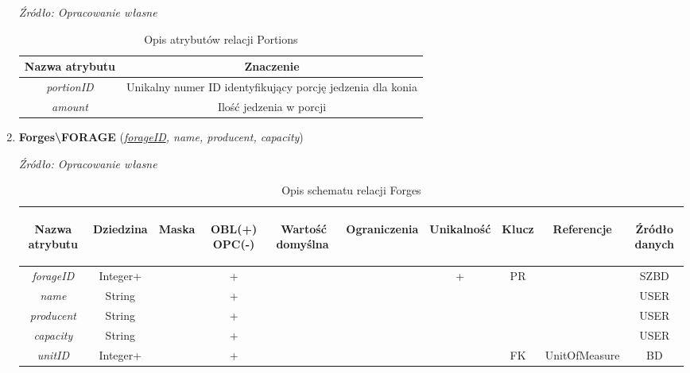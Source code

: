 \documentclass[12pt,oneside]{report}
\begin{document}
\begin{enumerate}[start=1,label={\bfseries REL\textbackslash0\arabic*}]
\begin{table}[H]
	\caption{Opis atrybutów relacji Portions}
	\textit{Źródło: Opracowanie własne}
	\label{PortionsAttributeDescription}
	\centering
	\begin{tabular}{|c|c|}
		\hline
		Nazwa atrybutu & Znaczenie \\
				\hline
		\textit{portionID}& Unikalny numer ID identyfikujący porcję jedzenia dla konia \\		
		\hline
		\textit{amount}& Ilość jedzenia w porcji\\
		\hline
	\end{tabular}
\end{table}
\newpage
\item \textbf{Forges\textbackslash FORAGE} (\textit{\underline{forageID}, name, producent, capacity})
\begin{table}[H]
	\caption{Opis schematu relacji Forges}
	\textit{Źródło: Opracowanie własne}
	\label{ForgesRelationSchema}
	\centering
	\begin{tabular}{|c|c|c|c|c|c|c|c|c|c|}
		\hline
		\begin{sideways}Nazwa atrybutu\end{sideways}& 
		\begin{sideways}Dziedzina \end{sideways}& 
		\begin{sideways}Maska \end{sideways}& 
		\begin{sideways}OBL(+) OPC(-)\end{sideways} & 
		\begin{sideways}Wartość domyślna$\ $\end{sideways}& 
		\begin{sideways}Ograniczenia\end{sideways} &
		\begin{sideways}Unikalność \end{sideways}& 
		\begin{sideways}Klucz \end{sideways}& 
		\begin{sideways}Referencje \end{sideways}&
		\begin{sideways}Źródło danych\end{sideways}\\
		\hline
		\textit{forageID}&Integer+&&+&&&+&PR&&SZBD\\		
		\hline		
		\textit{name}&String&&+&&&&&&USER\\		
		\hline
		\textit{producent}&String&&+&&&&&&USER\\		
		\hline		
		\textit{capacity}&String&&+&&&&&&USER\\		
		\hline
		\textit{unitID}&Integer+&&+&&&&FK&UnitOfMeasure&BD\\
		\hline
	\end{tabular}
\end{table}


\end{enumerate}
\end{document}
